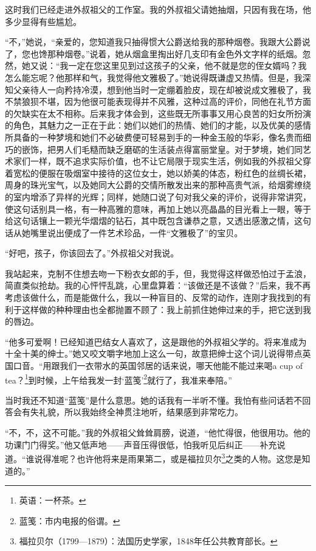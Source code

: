 \par 这时我们已经走进外叔祖父的工作室。我的外叔祖父请她抽烟，只因有我在场，他多少显得有些尴尬。
\par “不，”她说，“亲爱的，您知道我只抽得惯大公爵送给我的那种烟卷。我跟大公爵说了，您也馋那种烟卷。”说着，她从烟盒里掏出好几支印有金色外文字样的纸烟。忽然，她又说：“我一定在您这里见到过这孩子的父亲，他不就是您的侄女婿吗？我怎么能忘呢？他那样和气，我觉得他文雅极了。”她说得既谦虚又热情。但是，我深知父亲待人一向矜持冷漠，想到他当时一定绷着脸皮，现在却被说成文雅极了，我不禁狼狈不堪，因为他很可能表现得并不风雅，这种过高的评价，同他在礼节方面的欠缺实在太不相称。后来我才体会到，这些既无所事事又用心良苦的妇女所扮演的角色，其魅力之一正在于此：她们以她们的热情、她们的才能，以及优美的感情所具备的一种梦境和她们不必破费便可轻易到手的一种金玉般的华彩，像名贵而细巧的嵌饰，把男人们毛糙而缺乏磨砺的生活装点得富丽堂皇。对于梦境，她们同艺术家们一样，既不追求实际价值，也不让它局限于现实生活，例如我的外叔祖父穿着宽松的便服在吸烟室中接待的这位女士，她以娇美的体态，粉红色的丝绸长裙，周身的珠光宝气，以及她同大公爵的交情所散发出来的那种高贵气派，给烟雾缭绕的室内增添了异样的光辉；同样，她随口说了句对我父亲的评价，说得非常讲究，使这句话别具一格，有一种高雅的意味，再加上她以亮晶晶的目光看上一眼，等于给这句话镶上一颗光华熠熠的钻石，其中既包含谦恭之意，又透出感激之情，这句话从她嘴里说出便成了一件艺术珍品，一件“文雅极了”的宝贝。
\par “好吧，孩子，你该回去了。”外叔祖父对我说。
\par 我站起来，克制不住想去吻一下粉衣女郎的手，但，我觉得这样做恐怕过于孟浪，简直类似抢劫。我的心怦怦乱跳，心里盘算着：“该做还是不该做？”后来，我不再考虑该做什么，而是能做什么，我以一种盲目的、反常的动作，连刚才我找到的有利于这样做的种种理由也全都抛置不顾了：我上前抓住她伸过来的手，把它送到我的唇边。
\par “他多可爱啊！已经知道巴结女人喜欢了，这是跟他的外叔祖父学的。将来准成为十全十美的绅士。”她又咬文嚼字地加上这么一句，故意把绅士这个词儿说得带点英国口音。“用跟我们一衣带水的英国邻居的话来说，哪天他能不能过来喝a cup of tea？\footnote{英语：一杯茶。}到时候，上午给我发一封‘蓝笺’\footnote{蓝笺：市内电报的俗谓。}就行了，我准来奉陪。”
\par 当时我还不知道“蓝笺”是什么意思。她的话我有一半听不懂。我怕有些问话若不回答会有失礼貌，所以我始终全神贯注地听，结果感到非常吃力。
\par “不，不，这不可能。”我的外叔祖父耸耸肩膀，说道，“他忙得很，他很用功。他的功课门门得奖。”他又低声地——声音压得很低，怕我听见后纠正——补充说道。“谁说得准呢？也许他将来是雨果第二，或是福拉贝尔\footnote{福拉贝尔（1799—1879）：法国历史学家，1848年任公共教育部长。}之类的人物。这您是知道的。”
